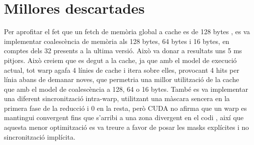 \documentclass[catalan,10pt,a4paper]{article}
\begin{document}
\section*{Millores descartades}
Per aprofitar el fet que un fetch de memòria global a cache es de 128 bytes \cite{nvidiaDeveloperDoc}, es va implementar coalescència de memòria als 128 bytes, 64 bytes i 16 bytes, en comptes dels 32 presents a la ultima versió. Això va donar a resultats uns 5 ms pitjors. Això creiem que es degut a la cache, ja que amb el model de execució actual, tot warp agafa 4 línies de cache i itera sobre elles, provocant 4 hits per línia abans de demanar noves, que permetria una millor utilització de la cache que amb el model de coalescència a 128, 64 o 16 bytes.
També es va implementar una diferent sincronització intra-warp, utilitzant una màscara sencera en la primera fase de la reducció i 0 en la resta, però CUDA no afirma que un warp es mantingui convergent fins que s'arribi a una zona divergent en el codi \cite{warpPrimitives}, així que aquesta menor optimització es va treure a favor de posar les masks explícites i no sincronització implícita.
\newpage


\end{document}
